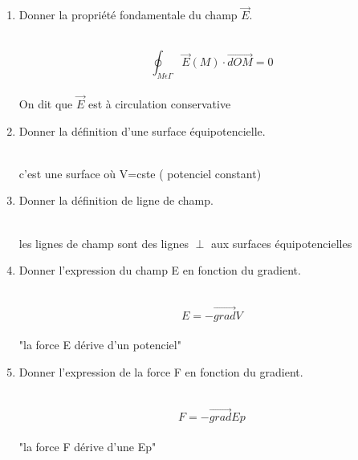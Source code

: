 \begin{enumerate}[label=\arabic{enumi} - , left=0pt, itemsep=1em]
\begin{solution}
    \end{solution}

    \item Donner la propriété fondamentale du champ $\vec{E}$. \par
    \begin{solution} \\
        \[\oint_{M \epsilon \Gamma} \vec{E}(M) \cdot \vec{dOM} = 0 \]\\
        On dit que $\vec{E}$ est à circulation conservative
    \end{solution}

    \item Donner la définition d'une surface équipotencielle. \par
    \begin{solution} \\
        c'est une surface où V=cste ( potenciel constant)
    \end{solution}

    \item Donner la définition de ligne de champ. \par
    \begin{solution} \\
        les lignes de champ sont des lignes $\perp$ aux surfaces équipotencielles
    \end{solution}

    \item Donner l'expression du champ E en fonction du gradient. \par
    \begin{solution} \\
        \[ E = - \vec{grad} V \]\\
        "la force E dérive d'un potenciel"
    \end{solution}

    \item Donner l'expression de la force F en fonction du gradient. \par
    \begin{solution} \\
        \[ F = - \vec{grad} Ep \]\\
        "la force F dérive d'une Ep"
    \end{solution}
\end{enumerate}